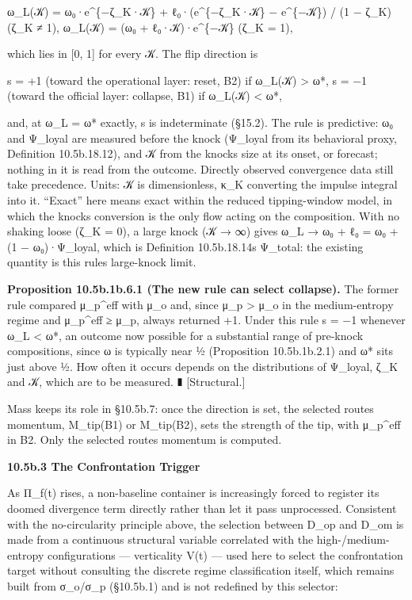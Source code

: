\documentclass[
]{article}
\begin{document}
ω\_L(𝒦) = ω₀·e\^{}\{−ζ\_K·𝒦\} + ℓ₀·(e\^{}\{−ζ\_K·𝒦\} − e\^{}\{−𝒦\}) / (1
− ζ\_K) (ζ\_K ≠ 1), ω\_L(𝒦) = (ω₀ + ℓ₀·𝒦)·e\^{}\{−𝒦\} (ζ\_K = 1),

which lies in {[}0, 1{]} for every 𝒦. The flip direction is

s = +1 (toward the operational layer: reset, B2) if ω\_L(𝒦)
\textgreater{} ω*, s = −1 (toward the official layer: collapse, B1) if
ω\_L(𝒦) \textless{} ω*,

and, at ω\_L = ω* exactly, s is indeterminate (§15.2). The rule is
predictive: ω₀ and Ψ\_loyal are measured before the knock (Ψ\_loyal from
its behavioral proxy, Definition 10.5b.18.12), and 𝒦 from the
knock\textquotesingle s size at its onset, or forecast; nothing in it is
read from the outcome. Directly observed convergence data still take
precedence. Units: 𝒦 is dimensionless, κ\_K converting the impulse
integral into it. ``Exact'' here means exact within the reduced
tipping-window model, in which the knock\textquotesingle s conversion is
the only flow acting on the composition. With no shaking loose (ζ\_K =
0), a large knock (𝒦 → ∞) gives ω\_L → ω₀ + ℓ₀ = ω₀ + (1 − ω₀)·Ψ\_loyal,
which is Definition 10.5b.18.14\textquotesingle s Ψ\_total: the existing
quantity is this rule\textquotesingle s large-knock limit.

\textbf{Proposition 10.5b.1b.6.1 (The new rule can select collapse).}
The former rule compared μ\_p\^{}eff with μ\_o and, since μ\_p
\textgreater{} μ\_o in the medium-entropy regime and μ\_p\^{}eff ≥ μ\_p,
always returned +1. Under this rule s = −1 whenever ω\_L \textless{} ω*,
an outcome now possible for a substantial range of pre-knock
compositions, since ω is typically near ½ (Proposition 10.5b.1b.2.1) and
ω* sits just above ½. How often it occurs depends on the distributions
of Ψ\_loyal, ζ\_K and 𝒦, which are to be measured. ∎ {[}Structural.{]}

Mass keeps its role in §10.5b.7: once the direction is set, the selected
route\textquotesingle s momentum, M\_tip(B1) or M\_tip(B2), sets the
strength of the tip, with μ\_p\^{}eff in B2. Only the selected
route\textquotesingle s momentum is computed.

\textbf{10.5b.3 The Confrontation Trigger}

As Π\_f(t) rises, a non-baseline container is increasingly forced to
register its doomed divergence term directly rather than let it pass
unprocessed. Consistent with the no-circularity principle above, the
selection between D\_op and D\_om is made from a continuous structural
variable correlated with the high-/medium-entropy configurations ---
verticality V(t) --- used here to select the confrontation target
without consulting the discrete regime classification itself, which
remains built from σ\_o/σ\_p (§10.5b.1) and is not redefined by this
selector:
\end{document}
